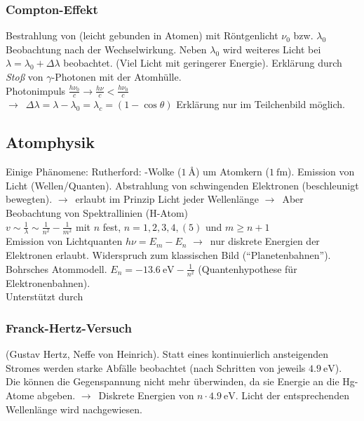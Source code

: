 \documentclass[oneside]{book}
\theoremstyle{definition}
\newcommand{\conseq}{$\rightarrow$~}
\newcommand{\circled}[1]{\tikz[baseline=(char.base)]{
		\node[shape=circle,draw,inner sep=2pt] (char) {#1};}}
\newcommand{\celectron}{\circled{$e^-$}}
\begin{document}
\subsubsection{Compton-Effekt}
Bestrahlung von \circled{$e^-$} (leicht gebunden in Atomen) mit Röntgenlicht $\nu_0$ bzw. $\lambda_0$\\
Beobachtung nach der Wechselwirkung. Neben $\lambda_0$ wird weiteres Licht bei $\lambda = \lambda_0 + \Delta \lambda$ beobachtet. (Viel Licht mit geringerer Energie). Erklärung durch \emph{Stoß} von $\gamma$-Photonen mit \circled{$e^-$} der Atomhülle.\\
Photonimpuls $\frac{h \nu_0}{c} \rightarrow \frac{h \nu}{c} < \frac{h \nu_0}{c}$\\
\conseq $\Delta \lambda = \lambda - \lambda_0 = \lambda_c = (1 - \cos \theta)$
Erklärung nur im Teilchenbild möglich.

\subsection{Atomphysik}
Einige Phänomene: Rutherford: \circled{$e^-$}-Wolke ($\SI{1}{\angstrom}$) um Atomkern ($\SI{1}{\femto\meter}$).
Emission von Licht (Wellen/Quanten). Abstrahlung von schwingenden Elektronen (beschleunigt bewegten).
\conseq erlaubt im Prinzip Licht jeder Wellenlänge \conseq Aber Beobachtung von Spektrallinien (H-Atom)\\
$v \sim \frac1\lambda \sim \frac{1}{n^2} - \frac{1}{m^2}$ mit $n$ fest, $n = 1, 2, 3, 4, (5)$ und $m \geq n + 1$\\
Emission von Lichtquanten $h \nu = E_m - E_n$ \conseq nur diskrete Energien der Elektronen erlaubt. Widerspruch zum klassischen Bild ("`Planetenbahnen"').\\
Bohrsches Atommodell. $E_n = \SI{-13.6}{\electronvolt} - \frac{1}{n^2}$ (Quantenhypothese für Elektronenbahnen).\\
Unterstützt durch

\subsubsection{Franck-Hertz-Versuch}
(Gustav Hertz,  Neffe von Heinrich).
Statt eines kontinuierlich ansteigenden Stromes werden starke Abfälle beobachtet (nach Schritten von jeweils $\SI{4.9}{\electronvolt}$). Die \celectron können die Gegenspannung nicht mehr überwinden, da sie Energie an die Hg-Atome abgeben. \conseq Diskrete Energien von $n \cdot \SI{4.9}{\electronvolt}$. Licht der entsprechenden Wellenlänge wird nachgewiesen.
\end{document}
